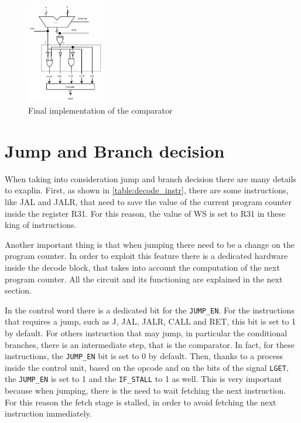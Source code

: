 \begin{figure}[H]
	\centering
	\includegraphics[width=0.3\textwidth]{chapters/4_DecodeStage/images/cmp_final.pdf}
	\caption{Final implementation of the comparator}
	\label{cmp_final}
\end{figure}

\section{Jump and Branch decision}
When taking into consideration jump and branch decision there are many details to exaplin. First, as shown in \autoref{table:decode_instr}, there are some instructions, like JAL and JALR, that need to save the value of the current program counter inside the register R31. For this reason, the value of WS is set to R31 in these king of instructions. 

Another important thing is that when jumping there need to be a change on the program counter. In order to exploit this feature there is a dedicated hardware inside the decode block, that takes into account the computation of the next program counter. All the circuit and its functioning are explained in the next section. 

In the control word there is a dedicated bit for the \texttt{JUMP\_EN}. For the instructions that requires a jump, such as J, JAL, JALR, CALL and RET, this bit is set to 1 by default. For others instruction that may jump, in particular the conditional branches, there is an intermediate step, that is the comparator. In fact, for these instructions, the \texttt{JUMP\_EN} bit is set to 0 by default. Then, thanks to a process inside the control unit, based on the opcode and on the bits of the signal \texttt{LGET}, the \texttt{JUMP\_EN} is set to 1 and the \texttt{IF\_STALL} to 1 as well. This is very important because when jumping, there is the need to wait fetching the next instruction. For this reason the fetch stage is stalled, in order to avoid fetching the next instruction immediately. 

